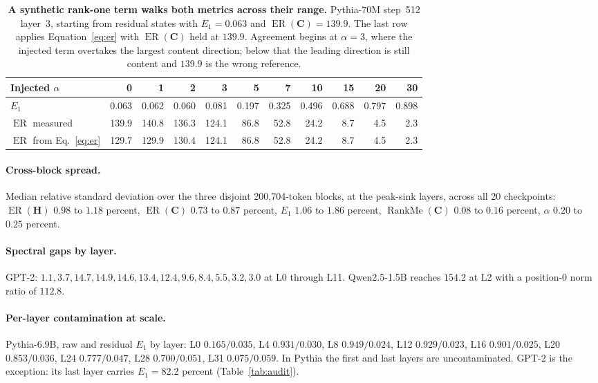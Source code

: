 \documentclass{article}
\theoremstyle{spaced}
\theoremstyle{definition}
\DeclareMathOperator{\ER}{ER}
\DeclareMathOperator{\RankMe}{RankMe}
\newcommand{\bH}{\mathbf{H}}
\newcommand{\bC}{\mathbf{C}}
\begin{document}
\begin{table}[t]
\centering
\caption{\textbf{A synthetic rank-one term walks both metrics across their range.} Pythia-70M step~512 layer~3, starting from residual states with $E_1 = 0.063$ and $\ER(\bC) = 139.9$. The last row applies Equation~\ref{eq:er} with $\ER(\bC)$ held at $139.9$. Agreement begins at $\alpha = 3$, where the injected term overtakes the largest content direction; below that the leading direction is still content and $139.9$ is the wrong reference.}
\label{tab:inject}
\small
\begin{tabular}{@{}lrrrrrrrrrr@{}}
\toprule
Injected $\alpha$ & 0 & 1 & 2 & 3 & 5 & 7 & 10 & 15 & 20 & 30 \\
\midrule
$E_1$ & 0.063 & 0.062 & 0.060 & 0.081 & 0.197 & 0.325 & 0.496 & 0.688 & 0.797 & 0.898 \\
$\ER$ measured & 139.9 & 140.8 & 136.3 & 124.1 & 86.8 & 52.8 & 24.2 & 8.7 & 4.5 & 2.3 \\
$\ER$ from Eq.~\ref{eq:er} & 129.7 & 129.9 & 130.4 & 124.1 & 86.8 & 52.8 & 24.2 & 8.7 & 4.5 & 2.3 \\
\bottomrule
\end{tabular}
\end{table}

\paragraph{Cross-block spread.} Median relative standard deviation over the three disjoint 200{,}704-token blocks, at the peak-sink layers, across all 20 checkpoints: $\ER(\bH)$ $0.98$ to $1.18$ percent, $\ER(\bC)$ $0.73$ to $0.87$ percent, $E_1$ $1.06$ to $1.86$ percent, $\RankMe(\bC)$ $0.08$ to $0.16$ percent, $\alpha$ $0.20$ to $0.25$ percent.

\paragraph{Spectral gaps by layer.} GPT-2: $1.1, 3.7, 14.7, 14.9, 14.6, 13.4, 12.4, 9.6, 8.4, 5.5, 3.2, 3.0$ at L0 through L11. Qwen2.5-1.5B reaches $154.2$ at L2 with a position-0 norm ratio of $112.8$.

\paragraph{Per-layer contamination at scale.} Pythia-6.9B, raw and residual $E_1$ by layer: L0 $0.165/0.035$, L4 $0.931/0.030$, L8 $0.949/0.024$, L12 $0.929/0.023$, L16 $0.901/0.025$, L20 $0.853/0.036$, L24 $0.777/0.047$, L28 $0.700/0.051$, L31 $0.075/0.059$. In Pythia the first and last layers are uncontaminated. GPT-2 is the exception: its last layer carries $E_1 = 82.2$ percent (Table~\ref{tab:audit}).
\end{document}

